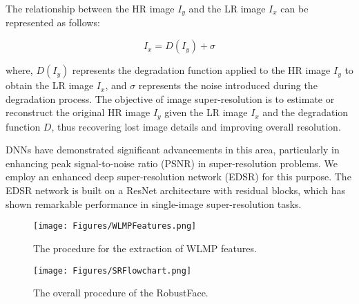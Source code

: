 \documentclass[sn-mathphys]{sn-jnl}%
\theoremstyle{thmstyleone}%
\theoremstyle{thmstyletwo}%
\theoremstyle{thmstylethree}%
\begin{document}
The relationship between the HR image $I_y$ and the LR image $I_x$ can be represented as follows:

\begin{equation}
I_x = D(I_y) + \sigma
\label{sr:eq:2}
\end{equation}

where, $D(I_y)$ represents the degradation function applied to the HR image $I_y$ to obtain the LR image $I_x$, and $\sigma$ represents the noise introduced during the degradation process. The objective of image super-resolution is to estimate or reconstruct the original HR image $I_y$ given the LR image $I_x$ and the degradation function $D$, thus recovering lost image details and improving overall resolution.


DNNs \cite{kim2016accurate, kim2016deeply} have demonstrated significant advancements in this area, particularly in enhancing peak signal-to-noise ratio (PSNR) in super-resolution problems. We employ an enhanced deep super-resolution network (EDSR) \cite{lim2017enhanced} for this purpose. The EDSR network is built on a ResNet architecture with residual blocks, which has shown remarkable performance in single-image super-resolution tasks. 

\begin{figure*}
 \center
  \texttt{[image: Figures/WLMPFeatures.png]}
  \caption{The procedure for the extraction of WLMP features.}
  \label{wlmpf}
\end{figure*}


\begin{figure*}
 \center
  \texttt{[image: Figures/SRFlowchart.png]}
  \caption{The overall procedure of the RobustFace.}
  \label{faadsrflowchart}
\end{figure*}
\end{document}
